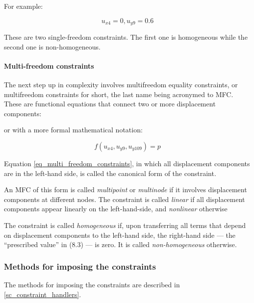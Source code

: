 \begin{center}
\end{center}

\noindent For example:

\begin{equation}
  u_{x4}= 0, u_{y9}= 0.6
\end{equation}

\noindent These are two single-freedom constraints. The first one is homogeneous while the second one is non-homogeneous.

\paragraph{Multi-freedom constraints}
The next step up in complexity involves multifreedom equality constraints, or multifreedom constraints for short,  the last name being acronymed to MFC. These are functional equations that connect two or more displacement components:

\begin{center}
\end{center}

\noindent or with a more formal mathematical notation:

\begin{equation}\label{eq_multi_freedom_constraints}
f(u_{x4}, u_{y9}, u_{y109})= p
\end{equation}

Equation \ref{eq_multi_freedom_constraints}, in which all displacement components are in the left-hand side, is called the canonical form of the constraint.

An MFC of this form is called \emph{multipoint} or \emph{multinode} if it involves displacement components at different nodes.  The constraint is called \emph{linear} if all displacement components appear linearly on the left-hand-side, and \emph{nonlinear} otherwise

The constraint is called \emph{homogeneous} if, upon transferring all terms that depend on displacement components to the left-hand side, the right-hand side — the ``prescribed value'' in (8.3) — is zero. It is called \emph{non-homogeneous} otherwise.

\subsubsection{Methods for imposing the constraints}
The methods for imposing the constraints are described in \ref{sc_constraint_handlers}.





